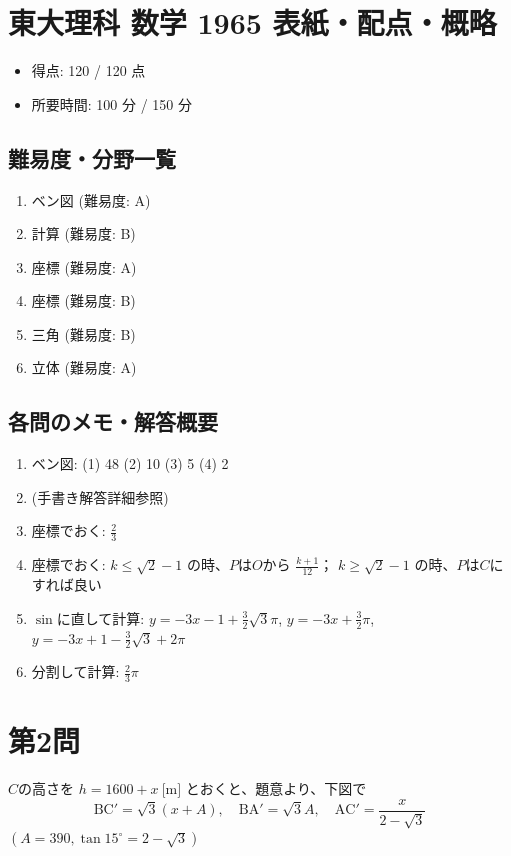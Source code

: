 \documentclass[../main.tex]{subfiles}
\begin{document}
\section*{東大理科 数学 1965 表紙・配点・概略}

\begin{itemize}
  \item 得点: 120 / 120 点
  \item 所要時間: 100 分 / 150 分
\end{itemize}

\subsection*{難易度・分野一覧}
\begin{enumerate}
  \item ベン図 (難易度: A)
  \item 計算 (難易度: B)
  \item 座標 (難易度: A)
  \item 座標 (難易度: B)
  \item 三角 (難易度: B)
  \item 立体 (難易度: A)
\end{enumerate}

\subsection*{各問のメモ・解答概要}
\begin{enumerate}
  \item ベン図: (1) 48 (2) 10 (3) 5 (4) 2
  \item (手書き解答詳細参照)
  \item 座標でおく: $\frac{2}{3}$
  \item 座標でおく: $k \le \sqrt{2}-1$ の時、$P$は$O$から $\frac{k+1}{12}$； $k \ge \sqrt{2}-1$ の時、$P$は$C$にすれば良い
  \item $\sin$に直して計算: $y = -3x - 1 + \frac{3}{2}\sqrt{3}\pi$, $y = -3x + \frac{3}{2}\pi$, $y = -3x + 1 - \frac{3}{2}\sqrt{3} + 2\pi$
  \item 分割して計算: $\frac{2}{3}\pi$
\end{enumerate}

\newpage

\section*{第2問}

\noindent
[\textbf{解}] $C$の高さを $h = 1600 + x\ \text{[m]}$ とおくと、題意より、下図で
\[
  \text{BC}' = \sqrt{3}(x+A), \quad \text{BA}' = \sqrt{3}A, \quad \text{AC}' = \frac{x}{2-\sqrt{3}}
\]
$(A = 390, \tan 15^\circ = 2-\sqrt{3})$
\end{document}
